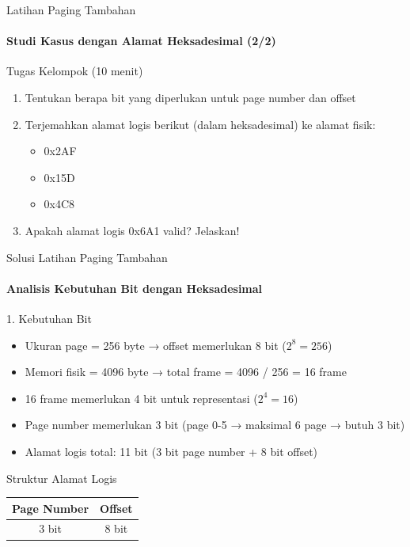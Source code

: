 \documentclass[10pt,aspectratio=169]{beamer}
\begin{document}
\begin{frame}{Latihan Paging Tambahan}
    \framesubtitle{Studi Kasus dengan Alamat Heksadesimal (2/2)}
    
    \begin{alertblock}{Tugas Kelompok (10 menit)}
        \begin{enumerate}
            \item Tentukan berapa bit yang diperlukan untuk page number dan offset
            \item Terjemahkan alamat logis berikut (dalam heksadesimal) ke alamat fisik:
            \begin{itemize}
                \item 0x2AF
                \item 0x15D
                \item 0x4C8
            \end{itemize}
            \item Apakah alamat logis 0x6A1 valid? Jelaskan!
        \end{enumerate}
    \end{alertblock}
\end{frame}

\begin{frame}{Solusi Latihan Paging Tambahan}
    \framesubtitle{Analisis Kebutuhan Bit dengan Heksadesimal}
    
    \begin{block}{1. Kebutuhan Bit}
        \begin{itemize}
            \item Ukuran page = 256 byte → offset memerlukan 8 bit ($2^8 = 256$)
            \item Memori fisik = 4096 byte → total frame = 4096 / 256 = 16 frame
            \item 16 frame memerlukan 4 bit untuk representasi ($2^4 = 16$)
            \item Page number memerlukan 3 bit (page 0-5 → maksimal 6 page → butuh 3 bit)
            \item Alamat logis total: 11 bit (3 bit page number + 8 bit offset)
        \end{itemize}
    \end{block}
    
    \begin{alertblock}{Struktur Alamat Logis}
        \begin{center}
            \begin{tabular}{|c|c|}
                \hline
                \textbf{Page Number} & \textbf{Offset} \\
                \hline
                3 bit & 8 bit \\
                \hline
            \end{tabular}
        \end{center}
    \end{alertblock}
\end{frame}
\end{document}

